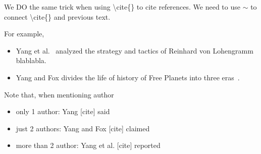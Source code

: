 We DO the same trick when using \textbackslash cite\{\} to cite references. We need to use $\sim$ to connect \textbackslash cite\{\} and previous text.

For example,
\begin{itemize}
\item Yang et al.~\cite{Yang_2016} analyzed the strategy and tactics of Reinhard von Lohengramm blablabla.
\item Yang and Fox divides the life of history of Free Planets into three eras~\cite{Yang_2017}.
\end{itemize}

Note that, when mentioning author
\begin{itemize}
\item only 1 author: Yang [cite] said
\item just 2 authors: Yang and Fox [cite] claimed
\item more than 2 author: Yang et al. [cite] reported
\end{itemize}